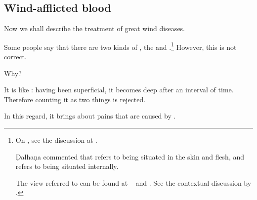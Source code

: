 \begin{translation}

    \subsection{Wind-afflicted blood}
    \item [1]
    Now we shall describe the treatment of great wind diseases.



    \item [3]

    Some people say that there are two kinds of
    , the
     and .\footnote{On
        , see the discussion at
        \pageref{ni1:vatarakta}.

        Ḍalhaṇa commented \citep[424]{vulgate} that  refers to
        being situated in the skin and flesh, and  refers to
        being situated internally.

        The view referred to can be found at \CS\  and
        .  See the contextual discussion by
        \citet[101]{emme-1984}.} However, this is not correct.

    Why?

    It is like : having been superficial, it
    becomes
    deep after an interval of time.  Therefore counting it as two things is
    rejected.

    \item[4]

    In this regard, it brings about pains that are caused by
    .


\end{translation}
